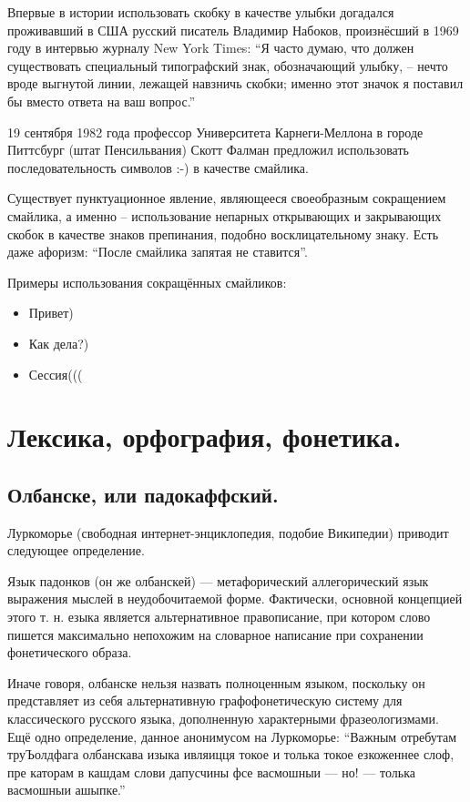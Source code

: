 Впервые в истории использовать скобку в качестве улыбки догадался проживавший в США русский писатель Владимир Набоков, произнёсший в 1969 году в интервью журналу New York Times: ``Я часто думаю, что должен существовать специальный типографский знак, обозначающий улыбку, -- нечто вроде выгнутой линии, лежащей навзничь скобки; именно этот значок я поставил бы вместо ответа на ваш вопрос.''

19 сентября 1982 года профессор Университета Карнеги-Меллона в городе Питтсбург (штат Пенсильвания) Скотт Фалман предложил использовать последовательность символов :-) в качестве смайлика.

Существует пунктуационное явление, являющееся своеобразным сокращением смайлика, а именно -- использование непарных открывающих и закрывающих скобок в качестве знаков препинания, подобно восклицательному знаку. Есть даже афоризм: ``После смайлика запятая не ставится''.

Примеры использования сокращённых смайликов:

\begin{itemize}

\item Привет)

\item Как дела?)

\item Сессия(((

\end{itemize}


\section{Лексика, орфография, фонетика.}

\subsection{Олбанске, или падокаффский.}

Луркоморье (свободная интернет-энциклопедия, подобие Википедии) приводит следующее определение.

\opred

Язык падонков (он же олбанскей) — метафорический аллегорический язык выражения мыслей в неудобочитаемой форме. Фактически, основной концепцией этого т. н. езыка является альтернативное правописание, при котором слово пишется максимально непохожим на словарное написание при сохранении фонетического образа.

Иначе говоря, олбанске нельзя назвать полноценным языком, поскольку он представляет из себя альтернативную графофонетическую систему для классического русского языка, дополненную характерными фразеологизмами.
Ещё одно определение, данное анонимусом на Луркоморье: ``Важным отребутам труЪолдфага олбанскава изыка ивляицця токое и толька токое езкоженнее слоф, пре каторам в кашдам слови дапусчины фсе васмошныи — но! — толька васмошныи ашыпке.''


